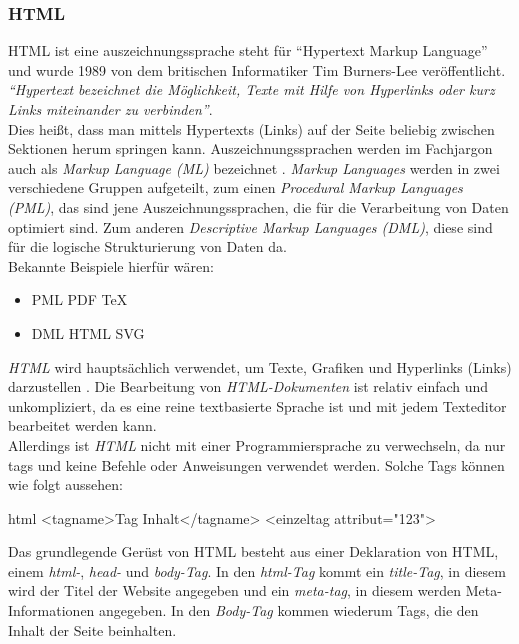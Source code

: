 		\subsubsection{HTML}
		HTML ist eine \Gls{auszeichnungssprache} steht für \enquote{Hypertext Markup Language} und wurde 1989 von dem britischen Informatiker Tim Burners-Lee veröffentlicht.\\ 
		\textit{\enquote{Hypertext bezeichnet die Möglichkeit, Texte mit Hilfe von Hyperlinks oder kurz Links miteinander zu verbinden}}\cite{html5-css3-def}.\\ 
		Dies heißt, dass man mittels Hypertexts (Links) auf der Seite beliebig zwischen Sektionen herum springen kann.
		Auszeichnungssprachen werden im Fachjargon auch als \textit{Markup Language (ML)} bezeichnet \cite{auszeichnungssprachen}. \textit{Markup Languages} werden in zwei verschiedene Gruppen aufgeteilt, zum einen \textit{Procedural Markup Languages (PML)}, das sind jene Auszeichnungssprachen, die für die Verarbeitung von Daten optimiert sind. Zum anderen \textit{Descriptive Markup Languages (DML)}, diese sind für die logische Strukturierung von Daten da.\\Bekannte Beispiele hierfür wären:
		\begin{itemize}
		\item PML
		\subitem PDF
		\subitem TeX
		\item DML
		\subitem HTML
		\subitem SVG
		\end{itemize}
		\textit{HTML} wird hauptsächlich verwendet, um Texte, Grafiken und Hyperlinks (Links) darzustellen \cite{html5-css3-handbuch, html5-css3-def}. Die Bearbeitung von \textit{HTML-Dokumenten} ist relativ einfach und unkompliziert, da es eine reine textbasierte Sprache ist und mit jedem Texteditor bearbeitet werden kann.\\
		Allerdings ist \textit{HTML} nicht mit einer Programmiersprache zu verwechseln, da nur \Gls{tag}s und keine Befehle oder Anweisungen verwendet werden. Solche Tags können wie folgt aussehen:
		\begin{code}{html}
			<tagname>Tag Inhalt</tagname>
			<einzeltag attribut="123">
		\end{code}
		Das grundlegende Gerüst von HTML besteht aus einer Deklaration von HTML, einem \textit{html-}, \textit{head-} und \textit{body-Tag}. In den \textit{html-Tag} kommt ein \textit{title-Tag}, in diesem wird der Titel der Website angegeben und ein \textit{meta-tag}, in diesem werden Meta-Informationen angegeben. In den \textit{Body-Tag} kommen wiederum Tags, die den Inhalt der Seite beinhalten. 
